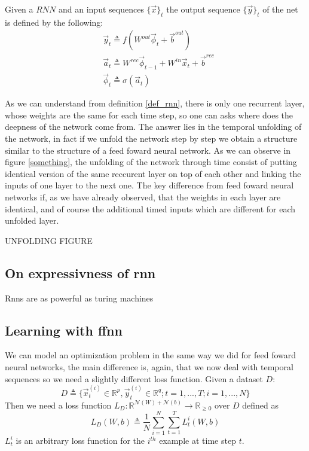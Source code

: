 Given a $RNN$ and an input sequences $\{\vec{x}\}_t$ the output sequence $\{\vec{y}\}_t$ of the net is defined by the following:
\begin{align}
&\vec{y}_t \triangleq f(W^{out}\vec{\phi}_t + \vec{b}^{out})\\
&\vec{a}_t \triangleq W^{rec}\vec{\phi}_{t-1}+W^{in}\vec{x}_t+\vec{b}^{rec}\\
&\vec{\phi}_t \triangleq  \sigma(\vec{a}_t)
\end{align}

As we can understand from definition \ref{def_rnn}, there is only one recurrent layer, whose weights are the same for each time step, so one can asks where does the deepness of the network come from.
The answer lies in the temporal unfolding of the network, in fact if we unfold the network step by step we obtain a structure similar to the structure of a feed foward neural network. As we can observe
in figure \ref{something}, the unfolding of the network through time consist of putting identical version of the same reccurent layer on top of each other and linking the inputs of one layer to the
next one. The key difference from feed foward neural networks if, as we have already observed, that the weights in each layer are identical, and of course the additional timed inputs which are different for
each unfolded layer.

UNFOLDING FIGURE

\subsection{On expressivness of rnn}
Rnns are as powerful as turing machines
\subsection{Learning with ffnn}
We can model an optimization problem in the same way we did for feed foward neural networks, the main difference is, again, that we now deal with temporal sequences so we need a slightly different
loss function.
Given a dataset $D$:
\begin{equation}
D\triangleq\{\vec{x}_t^{(i)} \in \mathbb{R}^p, \vec{y}_t^{(i)} \in \mathbb{R}^q; t=1,...,T;  i=1,...,N\}
\end{equation}
Then we need a loss function $L_D:\mathbb{R}^{\mathcal{N}(W)+\mathcal{N}(b)} \rightarrow \mathbb{R}_{\geq 0}$ over $D$ defined as
\begin{equation}
L_D(W,b)\triangleq\frac{1}{N}\sum_{i=1}^N \sum_{t=1}^T L_t^i(W,b) 
\end{equation}
$L_t^i$ is an arbitrary loss function for the $i^{th}$ example at time step $t$.









